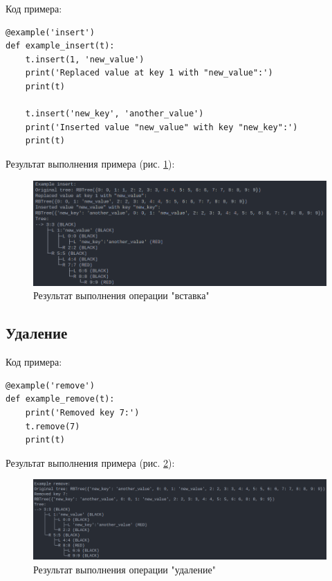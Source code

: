Код примера:

\begin{lstlisting}
@example('insert')
def example_insert(t):
    t.insert(1, 'new_value')
    print('Replaced value at key 1 with "new_value":')
    print(t)
    
    t.insert('new_key', 'another_value')
    print('Inserted value "new_value" with key "new_key":')
    print(t)
\end{lstlisting}

Результат выполнения примера (рис. \ref{fig:insert}):

\begin{figure}[H]
    \centering
    \includegraphics[width=0.85\linewidth]{photo/example_insert}
    \caption{Результат выполнения операции "вставка"}
    \label{fig:insert}
\end{figure}

\subsection{Удаление}

Код примера:

\begin{lstlisting}
@example('remove')
def example_remove(t):
    print('Removed key 7:')
    t.remove(7)
    print(t)
\end{lstlisting}

Результат выполнения примера (рис. \ref{fig:remove}):

\begin{figure}[H]
    \centering
    \includegraphics[width=0.85\linewidth]{photo/example_remove}
    \caption{Результат выполнения операции "удаление"}
    \label{fig:remove}
\end{figure}

